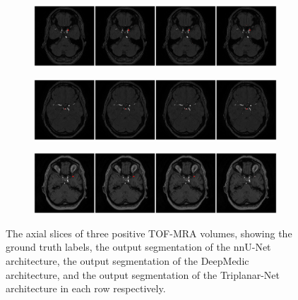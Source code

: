 \begin{figure}[htp]
	\centering
	\begin{subfigure}{\linewidth}
		\includegraphics[width=\linewidth]{figures/results_10049F.pdf}
	\end{subfigure}
	\begin{subfigure}{\linewidth}
		\includegraphics[width=\linewidth]{figures/results_10034.pdf}
	\end{subfigure}
	\begin{subfigure}{\linewidth}
		\includegraphics[width=\linewidth]{figures/results_10073F.pdf}
	\end{subfigure}
	\caption[Qualitative results of each network on three positive cases.]{The axial slices of three positive TOF-MRA volumes, showing the ground truth labels, the output segmentation of the nnU-Net architecture, the output segmentation of the DeepMedic architecture, and the output segmentation of the Triplanar-Net architecture in each row respectively.}
	\label{fig:qual_results}
\end{figure}